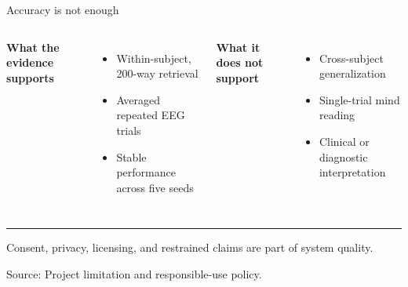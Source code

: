 \documentclass[aspectratio=169,11pt]{beamer}
\newcommand{\sourcefooter}[1]{%
  \vfill
  {\color{Muted}\fontsize{8.5}{10}\selectfont Source: #1\par}
}
\begin{document}
\begin{frame}{Accuracy is not enough}
  \vspace{0.22cm}
  \begin{columns}[T,onlytextwidth]
      {\color{Blue}\bfseries\fontsize{20}{24}\selectfont What the evidence supports\par}
      \vspace{0.18cm}
      \begin{itemize}
        \item Within-subject, 200-way retrieval
        \item Averaged repeated EEG trials
        \item Stable performance across five seeds
      \end{itemize}

      {\color{Orange}\bfseries\fontsize{20}{24}\selectfont What it does not support\par}
      \vspace{0.18cm}
      \begin{itemize}
        \item Cross-subject generalization
        \item Single-trial mind reading
        \item Clinical or diagnostic interpretation
      \end{itemize}
  \end{columns}

  \vspace{0.20cm}
  {\color{Teal}\rule{\textwidth}{2.4pt}}
  \vspace{0.14cm}
  {\fontsize{13}{16}\selectfont
    Consent, privacy, licensing, and restrained claims are part of system quality.
  \par}
  \sourcefooter{Project limitation and responsible-use policy.}
\end{frame}

\end{document}

